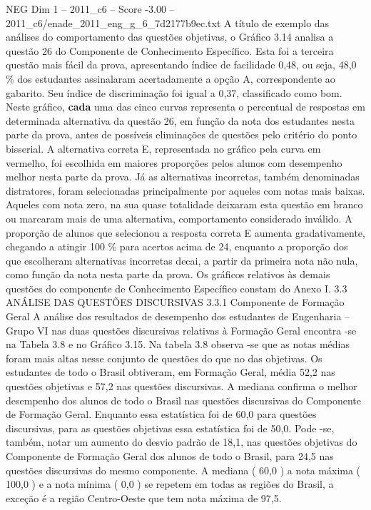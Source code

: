 \begin{textsample}{NEG Dim 1 – 2011\_c6 – Score -3.00 – 2011\_c6/enade\_2011\_eng\_g\_6\_7d2177b9ec.txt}
A título de exemplo das análises do comportamento das questões objetivas, o Gráfico 3.14 analisa a questão 26 do Componente de Conhecimento Específico.
Esta foi a terceira questão mais fácil da prova, apresentando índice de facilidade 0,48, ou seja, 48,0 \% dos estudantes assinalaram acertadamente a opção A, correspondente ao gabarito.
Seu índice de discriminação foi igual a 0,37, classificado como bom.
Neste gráfico, \textbf{cada} uma das cinco curvas representa o percentual de respostas em determinada alternativa da questão 26, em função da nota dos estudantes nesta parte da prova, antes de possíveis eliminações de questões pelo critério do ponto bisserial.
A alternativa correta E, representada no gráfico pela curva em vermelho, foi escolhida em maiores proporções pelos alunos com desempenho melhor nesta parte da prova.
Já as alternativas incorretas, também denominadas distratores, foram selecionadas principalmente por aqueles com notas mais baixas.
Aqueles com nota zero, na sua quase totalidade deixaram esta questão em branco ou marcaram mais de uma alternativa, comportamento considerado inválido.
A proporção de alunos que selecionou a resposta correta E aumenta gradativamente, chegando a atingir 100 \% para acertos acima de 24, enquanto a proporção dos que escolheram alternativas incorretas decai, a partir da primeira nota não nula, como função da nota nesta parte da prova.
Os gráficos relativos às demais questões do componente de Conhecimento Específico constam do Anexo I. 3.3 ANÁLISE DAS QUESTÕES DISCURSIVAS 3.3.1 Componente de Formação Geral A análise dos resultados de desempenho dos estudantes de Engenharia – Grupo VI nas duas questões discursivas relativas à Formação Geral encontra -se na Tabela 3.8 e no Gráfico 3.15.
Na tabela 3.8 observa -se que as notas médias foram mais altas nesse conjunto de questões do que no das objetivas.
Os estudantes de todo o Brasil obtiveram, em Formação Geral, média 52,2 nas questões objetivas e 57,2 nas questões discursivas.
A mediana confirma o melhor desempenho dos alunos de todo o Brasil nas questões discursivas do Componente de Formação Geral.
Enquanto essa estatística foi de 60,0 para questões discursivas, para as questões objetivas essa estatística foi de 50,0.
Pode -se, também, notar um aumento do desvio padrão de 18,1, nas questões objetivas do Componente de Formação Geral dos alunos de todo o Brasil, para 24,5 nas questões discursivas do mesmo componente.
A mediana ( 60,0 ) a nota máxima ( 100,0 ) e a nota mínima ( 0,0 ) se repetem em todas as regiões do Brasil, a exceção é a região Centro-Oeste que tem nota máxima de 97,5.

\end{textsample}
